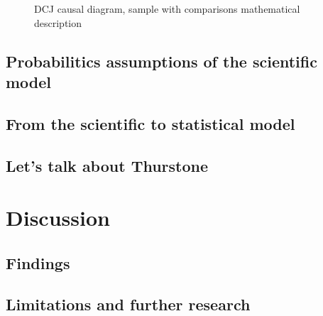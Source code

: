 \documentclass[
  authoryear,
  preprint,
  1p]{elsarticle}
\begin{document}
\begin{figure}


\caption{\label{fig-SciModel_samp}DCJ causal diagram, sample with
comparisons mathematical description}

\end{figure}%

\subsection{Probabilitics assumptions of the scientific
model}\label{sec-theory-probability}

\subsection{From the scientific to statistical
model}\label{sec-theory-statistics}

\subsection{Let's talk about Thurstone}\label{sec-theory-thurstone}

\section{Discussion}\label{sec-discuss}

\subsection{Findings}\label{sec-discuss-finding}

\subsection{Limitations and further
research}\label{sec-discuss-limitations}
\end{document}
